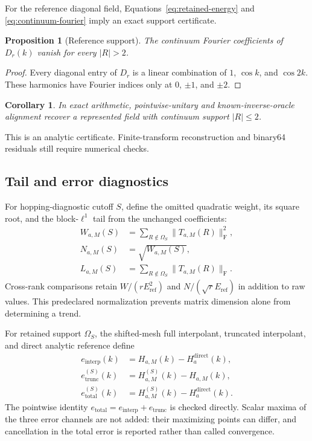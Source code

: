 \documentclass[11pt]{article}
\newtheorem{proposition}{Proposition}
\newtheorem{corollary}{Corollary}
\newcommand{\Eref}{E_{\mathrm{ref}}}
\newcommand{\Frob}{\mathrm F}
\begin{document}
For the reference diagonal field, Equations~\eqref{eq:retained-energy} and
\eqref{eq:continuum-fourier} imply an exact support certificate.

\begin{proposition}[Reference support]
The continuum Fourier coefficients of $D_r(k)$ vanish for every $|R|>2$.
\end{proposition}

\begin{proof}
Every diagonal entry of $D_r$ is a linear combination of $1$, $\cos k$, and
$\cos2k$. These harmonics have Fourier indices only at $0$, $\pm1$, and $\pm2$.
\end{proof}

\begin{corollary}
In exact arithmetic, pointwise-unitary and known-inverse-oracle alignment recover a
represented field with continuum support $|R|\leq2$.
\end{corollary}

This is an analytic certificate. Finite-transform reconstruction and binary64 residuals
still require numerical checks.

\subsection{Tail and error diagnostics}

For hopping-diagnostic cutoff $S$, define the omitted quadratic weight, its square root,
and the block-$\ell^1$ tail from the unchanged coefficients:
\begin{align}
 W_{a,M}(S)&=\sum_{R\notin\Omega_S}\|T_{a,M}(R)\|_\Frob^2,\\
 N_{a,M}(S)&=\sqrt{W_{a,M}(S)},\\
 L_{a,M}(S)&=\sum_{R\notin\Omega_S}\|T_{a,M}(R)\|_\Frob.
\end{align}
Cross-rank comparisons retain $W/(r\Eref^2)$ and $N/(\sqrt r\Eref)$ in addition to raw
values. This predeclared normalization prevents matrix dimension alone from determining
a trend.

For retained support $\Omega_S$, the shifted-mesh full interpolant, truncated
interpolant, and direct analytic reference define
\begin{align}
 e_{\mathrm{interp}}(k)&=H_{a,M}(k)-H_a^{\mathrm{direct}}(k),\\
 e_{\mathrm{trunc}}^{(S)}(k)&=H_{a,M}^{(S)}(k)-H_{a,M}(k),\\
 e_{\mathrm{total}}^{(S)}(k)&=H_{a,M}^{(S)}(k)-H_a^{\mathrm{direct}}(k).
 \label{eq:error-channels}
\end{align}
The pointwise identity
$e_{\mathrm{total}}=e_{\mathrm{interp}}+e_{\mathrm{trunc}}$ is checked directly.
Scalar maxima of the three error channels are not added: their maximizing points can
differ, and cancellation in the total error is reported rather than called convergence.
\end{document}
